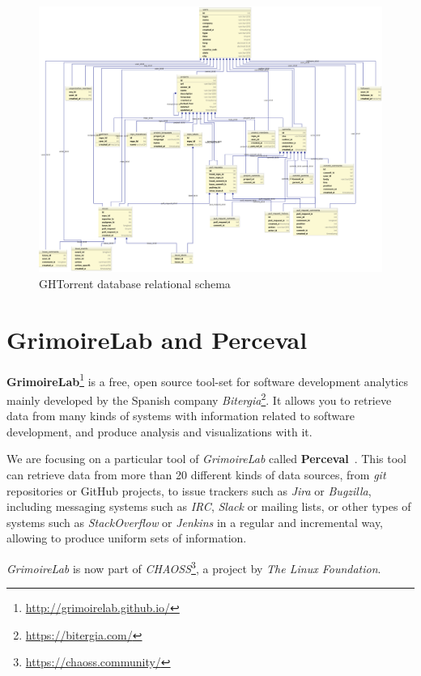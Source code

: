 \documentclass[a4paper, 12pt]{book}
\begin{document}
\begin{figure}
  \centering
  \includegraphics[width=16cm, keepaspectratio]{img/ghtorrent-schema}
  \caption{GHTorrent database relational schema}
  \label{fig:ghtorrent-schema}

\end{figure}
\section{GrimoireLab and Perceval}
\label{sec:grimoire}

\textbf{GrimoireLab}\footnote{\url{http://grimoirelab.github.io/}} is a free, open source tool-set for software development analytics
mainly developed by the Spanish company \emph{Bitergia}\footnote{\url{https://bitergia.com/}}.
It allows you to retrieve data from many kinds of systems with information related to software development, and produce
analysis and visualizations with it.

We are focusing on a particular tool of \emph{GrimoireLab} called \textbf{Perceval}~\cite{duenas18:perceval}. This tool can retrieve data from more
than 20 different kinds of data sources, from \emph{git} repositories or GitHub projects, to issue trackers such as \emph{Jira}
or \emph{Bugzilla}, including messaging systems such as \emph{IRC}, \emph{Slack} or mailing lists, or other types of systems such as
\emph{StackOverflow} or \emph{Jenkins} in a regular and incremental way, allowing to produce uniform sets of information.

\emph{GrimoireLab} is now part of \emph{CHAOSS}\footnote{\url{https://chaoss.community/}}, a project by \emph{The Linux Foundation}.
\end{document}
